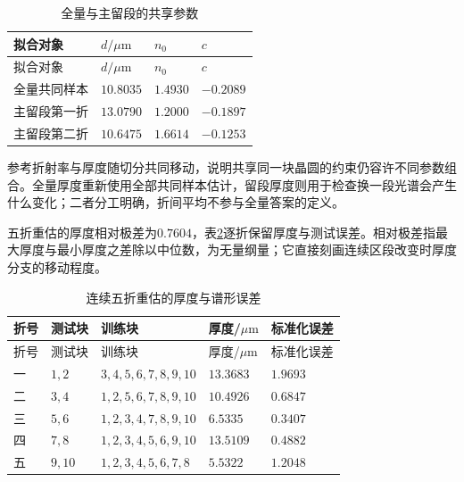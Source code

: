 \begingroup
\small
\renewcommand{\arraystretch}{1.15}
\begin{longtable}{>{\centering\arraybackslash}p{}>{\centering\arraybackslash}p{}>{\centering\arraybackslash}p{}>{\centering\arraybackslash}p{}}
\caption{全量与主留段的共享参数}\label{tab:q2-app-parameters}\\
\toprule
拟合对象 & $d/\mu\mathrm{m}$ & $n_0$ & $c$ \\
\midrule
\endfirsthead
\toprule
拟合对象 & $d/\mu\mathrm{m}$ & $n_0$ & $c$ \\
\midrule
\endhead
\bottomrule
\endfoot
全量共同样本 & $10.8035$ & $1.4930$ & $-0.2089$ \\
主留段第一折 & $13.0790$ & $1.2000$ & $-0.1897$ \\
主留段第二折 & $10.6475$ & $1.6614$ & $-0.1253$ \\
\end{longtable}
\endgroup

参考折射率与厚度随切分共同移动，说明共享同一块晶圆的约束仍容许不同参数组合。全量厚度重新使用全部共同样本估计，留段厚度则用于检查换一段光谱会产生什么变化；二者分工明确，折间平均不参与全量答案的定义。

五折重估的厚度相对极差为$0.7604$，表\ref{tab:q2-app-fivefold}逐折保留厚度与测试误差。相对极差指最大厚度与最小厚度之差除以中位数，为无量纲量；它直接刻画连续区段改变时厚度分支的移动程度。

\begingroup
\small
\renewcommand{\arraystretch}{1.15}
\begin{longtable}{>{\centering\arraybackslash}p{}>{\centering\arraybackslash}p{}>{\centering\arraybackslash}p{}>{\centering\arraybackslash}p{}>{\centering\arraybackslash}p{}}
\caption{连续五折重估的厚度与谱形误差}\label{tab:q2-app-fivefold}\\
\toprule
折号 & 测试块 & 训练块 & 厚度/$\mu\mathrm{m}$ & 标准化误差 \\
\midrule
\endfirsthead
\toprule
折号 & 测试块 & 训练块 & 厚度/$\mu\mathrm{m}$ & 标准化误差 \\
\midrule
\endhead
\bottomrule
\endfoot
一 & $1,2$ & $3,4,5,6,7,8,9,10$ & $13.3683$ & $1.9693$ \\
二 & $3,4$ & $1,2,5,6,7,8,9,10$ & $10.4926$ & $0.6847$ \\
三 & $5,6$ & $1,2,3,4,7,8,9,10$ & $6.5335$ & $0.3407$ \\
四 & $7,8$ & $1,2,3,4,5,6,9,10$ & $13.5109$ & $0.4882$ \\
五 & $9,10$ & $1,2,3,4,5,6,7,8$ & $5.5322$ & $1.2048$ \\
\end{longtable}
\endgroup

